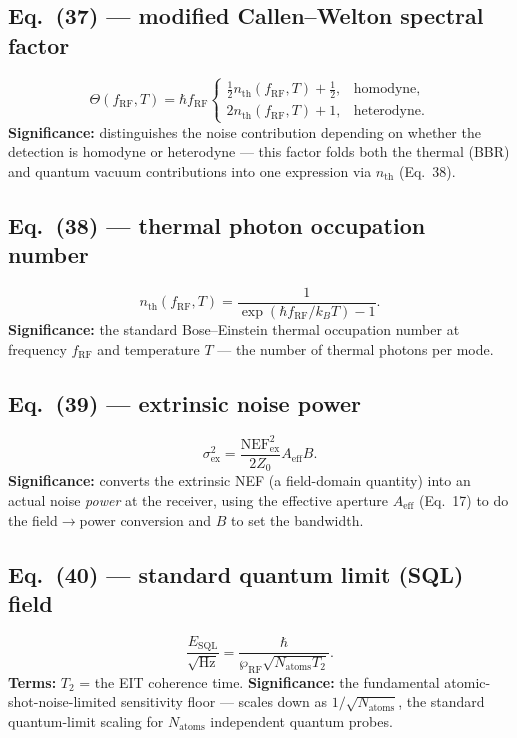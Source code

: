 \documentclass[11pt]{article}
\begin{document}
\subsection*{Eq.~(37) --- modified Callen--Welton spectral factor}
\begin{equation}
\Theta(f_\text{RF},T) = \hbar f_\text{RF}
\begin{cases}
\tfrac12 n_\text{th}(f_\text{RF},T)+\tfrac12, & \text{homodyne},\\
2n_\text{th}(f_\text{RF},T)+1, & \text{heterodyne}.
\end{cases} \tag{37}
\end{equation}
\textbf{Significance:} distinguishes the noise contribution depending
on whether the detection is homodyne or heterodyne --- this factor
folds both the thermal (BBR) and quantum vacuum contributions into one
expression via $n_\text{th}$ (Eq.~38).

\subsection*{Eq.~(38) --- thermal photon occupation number}
\begin{equation}
n_\text{th}(f_\text{RF},T) = \frac{1}{\exp(\hbar f_\text{RF}/k_BT)-1}. \tag{38}
\end{equation}
\textbf{Significance:} the standard Bose--Einstein thermal occupation
number at frequency $f_\text{RF}$ and temperature $T$ --- the number of
thermal photons per mode.

\subsection*{Eq.~(39) --- extrinsic noise power}
\begin{equation}
\sigma_\text{ex}^2 = \frac{\text{NEF}_\text{ex}^2}{2Z_0}A_\text{eff}B. \tag{39}
\end{equation}
\textbf{Significance:} converts the extrinsic NEF (a field-domain
quantity) into an actual noise \emph{power} at the receiver, using the
effective aperture $A_\text{eff}$ (Eq.~17) to do the field$\to$power
conversion and $B$ to set the bandwidth.

\subsection*{Eq.~(40) --- standard quantum limit (SQL) field}
\begin{equation}
\frac{E_\text{SQL}}{\sqrt{\text{Hz}}} = \frac{\hbar}{\wp_\text{RF}\sqrt{N_\text{atoms}T_2}}. \tag{40}
\end{equation}
\textbf{Terms:} $T_2$ = the EIT coherence time.
\textbf{Significance:} the fundamental atomic-shot-noise-limited
sensitivity floor --- scales down as $1/\sqrt{N_\text{atoms}}$, the
standard quantum-limit scaling for $N_\text{atoms}$ independent quantum
probes.
\end{document}
